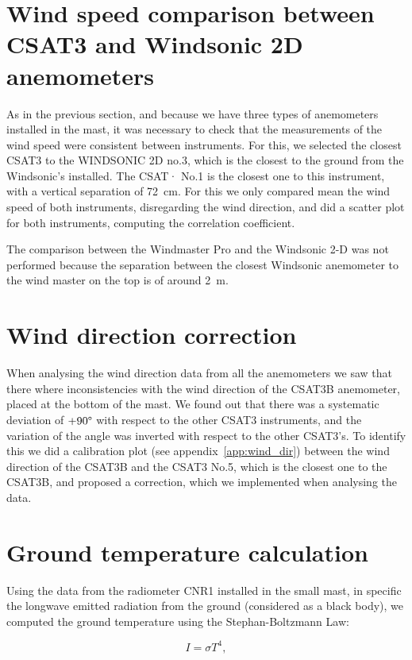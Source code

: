 \section{Wind speed comparison between CSAT3 and Windsonic 2D anemometers}

As in the previous section, and because we have three types of anemometers installed in the mast, it was necessary to check that the measurements of the wind speed were consistent between instruments. For this, we selected the closest CSAT3 to the WINDSONIC 2D no.3, which is the closest to the ground from the Windsonic's installed. The CSAT· No.1 is the closest one to this instrument, with a vertical separation of 72~cm. For this we only compared mean the wind speed of both instruments, disregarding the wind direction, and did a scatter plot for both instruments, computing the correlation coefficient. 

The comparison between the Windmaster Pro and the Windsonic 2-D was not performed because the separation between the closest Windsonic anemometer to the wind master on the top is of around 2~m. 

\section{Wind direction correction}

When analysing the wind direction data from all the anemometers we saw that there where inconsistencies with the wind direction of the CSAT3B anemometer, placed at the bottom of the mast. We found out that there was a systematic deviation of $+90\degree$ with respect to the other CSAT3 instruments, and the variation of the angle was inverted with respect to the other CSAT3's. To identify this we did a calibration plot (see appendix~\ref{app:wind_dir}) between the wind direction of the CSAT3B and the CSAT3 No.5, which is the closest one to the CSAT3B, and proposed a correction, which we implemented when analysing the data.

\section{Ground temperature calculation}

Using the data from the radiometer CNR1 installed in the small mast, in specific the longwave emitted radiation from the ground (considered as a black body), we computed the ground temperature using the Stephan-Boltzmann Law:

\begin{equation}
    I = \sigma T^4, 
\end{equation}

